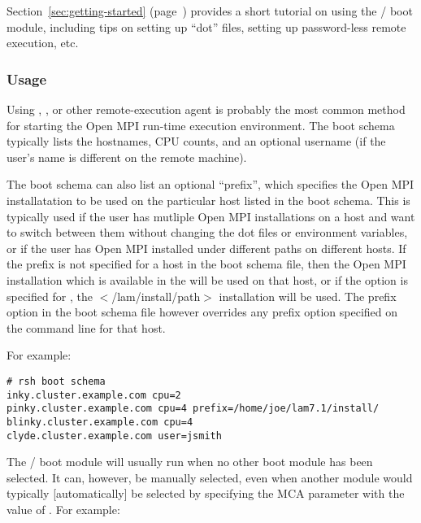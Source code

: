 Section~\ref{sec:getting-started} (page~\pageref{sec:getting-started})
provides a short tutorial on using the  /  boot
module, including tips on setting up ``dot'' files, setting up
password-less remote execution, etc.


\subsubsection{Usage}

Using , , or other remote-execution agent is
probably the most common method for starting the Open MPI run-time
execution environment.  The boot schema typically lists the hostnames,
CPU counts, and an optional username (if the user's name is different
on the remote machine).  


The boot schema can also list an optional ``prefix'', which specifies
the Open MPI installatation to be used on the particular host listed in
the boot schema. This is typically used if the user has mutliple
Open MPI installations on a host and want to switch between them
without changing the dot files or  environment variables,
or if the user has Open MPI installed under different paths on
different hosts.  If the prefix is not specified for a host in the
boot schema file, then the Open MPI installation which is available in
the  will be used on that host, or if the  option is specified for , the
$<$/lam/install/path$>$ installation will be used.  The prefix option
in the boot schema file however overrides any prefix option specified
on the  command line for that host.

For example:

\lstset{style=lam-shell}
\begin{lstlisting}
# rsh boot schema
inky.cluster.example.com cpu=2
pinky.cluster.example.com cpu=4 prefix=/home/joe/lam7.1/install/
blinky.cluster.example.com cpu=4
clyde.cluster.example.com user=jsmith
\end{lstlisting}


The  /  boot module will usually run when no other
boot module has been selected.  It can, however, be manually selected,
even when another module would typically [automatically] be selected
by specifying the  MCA parameter with the value of
.  For example:

